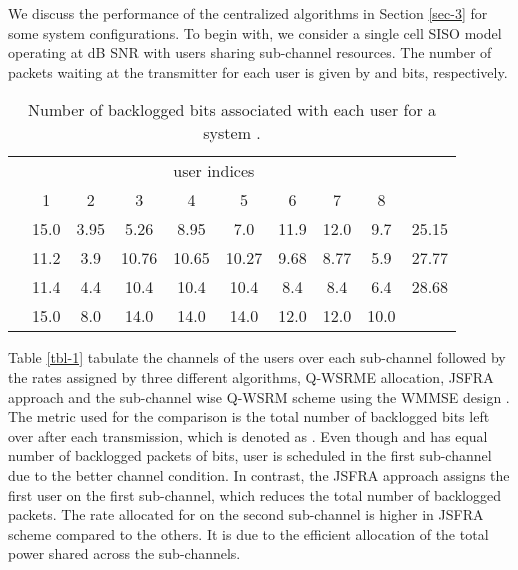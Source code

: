We discuss the performance of the centralized algorithms in Section \ref{sec-3} for some system configurations. To begin with, we consider a single cell \ac{SISO} model operating at  dB \ac{SNR} with  users sharing  sub-channel resources. The number of packets waiting at the transmitter for each user is given by  and  bits, respectively. 
\begin{table}
	\centering
	\caption{Number of backlogged bits associated with each user for a system .}
	\renewcommand{\arraystretch}{1.25} \scriptsize
	\begin{tabular}{|c|*{8}{c}|c|}
		\hline
		\multirow{2}{*}{\me{q}} & \multicolumn{8}{c|}{user indices} & \multirow{2}{*}{\me{\chi}} \\
		\cline{2-9}
		& 1 & 2 & 3 & 4 & 5 & 6 & 7 & 8 & \\
		\hline
		\hline
		\me{1} & 15.0 & 3.95 & 5.26 & 8.95 & 7.0 & 11.9 & 12.0 & 9.7 & 25.15 \\
		\me{2} & 11.2 & 3.9 & 10.76 & 10.65 & 10.27 & 9.68 & 8.77 & 5.9 & 27.77 \\
		\me{\infty} & 11.4 & 4.4 & 10.4 & 10.4 & 10.4 & 8.4 &  8.4 &  6.4 & 28.68 \\
		\hline
		\me{Q_k}  & 15.0 &  8.0 &  14.0 & 14.0 &  14.0 & 12.0 & 12.0 & 10.0  \\
		\cline{1-9}
	\end{tabular}
	\label{tbl-3}
\end{table}

Table \ref{tbl-1} tabulate the channels of the users over each sub-channel followed by the rates assigned by three different algorithms, \ac{Q-WSRME} allocation, \ac{JSFRA} approach and the sub-channel wise \ac{Q-WSRM} scheme using the \ac{WMMSE} design \cite{wmmse_shi}. The metric used for the comparison is the total number of backlogged bits left over after each transmission, which is denoted as . Even though  and  has equal number of backlogged packets of  bits, user  is scheduled in the first sub-channel due to the better channel condition. In contrast, the \ac{JSFRA} approach assigns the first user on the first sub-channel, which reduces the total number of backlogged packets. The rate allocated for  on the second sub-channel is higher in \ac{JSFRA} scheme compared to the others. It is due to the efficient allocation of the total power shared across the sub-channels.

